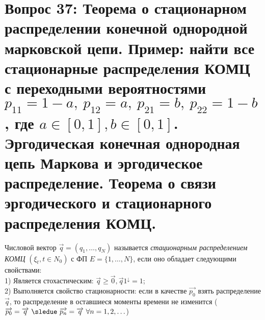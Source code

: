 \section{Вопрос 37:
Теорема о стационарном распределении конечной однородной марковской цепи.
Пример: найти все стационарные распределения КОМЦ с переходными вероятностями
$p_{11} = 1 - a, \ p_{12} = a, \ p_{21} = b, \ p_{22} = 1 - b$, где $a \in [0,1], b \in [0,1]$.
Эргодическая конечная однородная цепь Маркова и эргодическое распределение.
Теорема о связи эргодического и стационарного распределения КОМЦ.
}

\begin{defs}
  Числовой вектор $\overrightarrow{q} = (q_1, \ldots, q_N)$ называется \textit{стационарным распределением КОМЦ}
  $(\xi_t, t \in N_0)$ с ФП $E = \{1, \ldots, N\}$, если оно обладает следующими свойствами:\\
  1) Является стохастическим: $\overrightarrow{q} \geqslant \overrightarrow{0}, \overrightarrow{q}1^\downarrow = 1$;\\
  2) Выполняется свойство стационарности: если в качестве $\overrightarrow{p_0}$ взять распределение $\overrightarrow{q}$, то распределение
  в оставшиеся моменты времени не изменится ($\overrightarrow{p_0} = \overrightarrow{q} \ \sledue \
  \overrightarrow{p_n} = \overrightarrow{q} \ \forall n = 1,2,\ldots$)
\end{defs}

